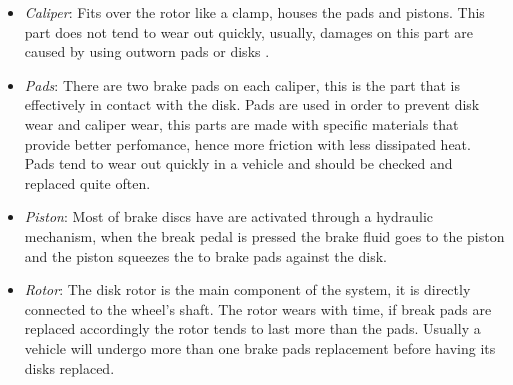 		\begin{itemize}
			\item\textit{Caliper}: Fits over the rotor like a clamp, houses the pads and pistons. This part does not tend to wear out quickly, usually, damages on this part are caused by using outworn pads or disks \cite{goodyear-calipers}.\label{itm:caliper}
			\item\textit{Pads}: There are two brake pads on each caliper, this is the part that is effectively in contact with the disk. Pads are used in order to prevent disk wear and caliper wear, this parts are made with specific materials that provide better perfomance, hence more friction with less dissipated heat. Pads tend to wear out quickly in a vehicle and should be checked and replaced quite often.\label{itm:pads}
			\item\textit{Piston}: Most of brake discs have are activated through a hydraulic mechanism, when the break pedal is pressed the brake fluid goes to the piston and the piston squeezes the to brake pads against the disk.\label{itm:piston}
			\item\textit{Rotor}: The disk rotor is the main component of the system, it is directly connected to the wheel's shaft. The rotor wears with time, if break pads are replaced accordingly the rotor tends to last more than the pads. Usually a vehicle will undergo more than one brake pads replacement before having its disks replaced. \label{itm:rotor}
		\end{itemize}